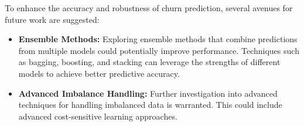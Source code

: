 \documentclass[12pt]{article}
\begin{document}
To enhance the accuracy and robustness of churn prediction, several avenues for future work are suggested:
\begin{itemize}
    \item \textbf{Ensemble Methods:} Exploring ensemble methods that combine predictions from multiple models could potentially improve performance. Techniques such as bagging, boosting, and stacking can leverage the strengths of different models to achieve better predictive accuracy.
    \item \textbf{Advanced Imbalance Handling:} Further investigation into advanced techniques for handling imbalanced data is warranted. This could include advanced cost-sensitive learning approaches.
\end{itemize}
\end{document}
